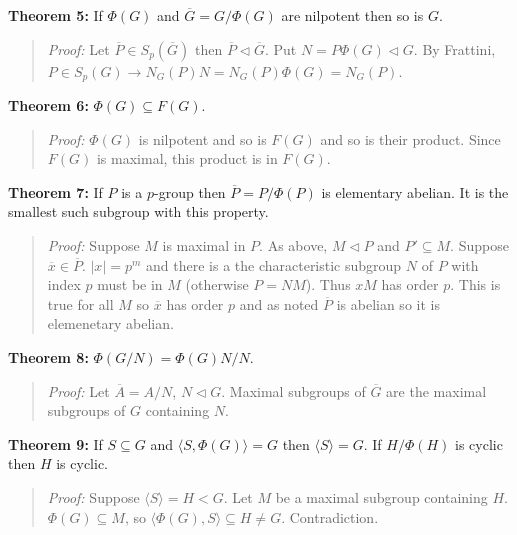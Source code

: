 {\bf Theorem 5:} If $\Phi(G)$ and ${\overline G}= G/\Phi(G)$ are nilpotent then so is $G$.
\begin{quote}
\emph{Proof:} Let ${\overline P} \in S_p({\overline G})$ then ${\overline P} \lhd {\overline G}$.
Put $N= P \Phi(G) \lhd G$.  
By Frattini, $P \in S_p(G) \rightarrow N_G(P)N= N_G(P) \Phi(G)= N_G(P)$.
\end{quote}
{\bf Theorem 6:} $\Phi(G) \subseteq F(G)$.
\begin{quote}
\emph{Proof:} $\Phi(G)$ is nilpotent and so is $F(G)$ and so is their product.  Since
$F(G)$ is maximal, this product is in $F(G)$.
\end{quote}
{\bf Theorem 7:} If $P$ is a $p$-group then ${\overline P}= P/\Phi(P)$ is elementary abelian.  It
is the smallest such subgroup with this property.
\begin{quote}
\emph{Proof:}  Suppose $M$ is maximal in $P$.  As above, $M \lhd P$ and $P' \subseteq M$.
Suppose ${\overline x} \in {\overline P}$.  $|x|= p^m$ and there is a the characteristic
subgroup $N$ of $P$ with index $p$ must be in $M$ (otherwise $P=NM$).  
Thus $xM$ has order $p$.  This is
true for all $M$ so ${\overline x}$ has order $p$ and as noted ${\overline P}$ is abelian so
it is elemenetary abelian.
\end{quote}
{\bf Theorem 8:} $\Phi(G/N)= \Phi(G)N/N$.
\begin{quote}
\emph{Proof:} Let ${\overline A}= A/N$, $N \lhd G$.  Maximal subgroups of ${\overline G}$ are
the maximal subgroups of $G$ containing $N$.
\end{quote}
{\bf Theorem 9:} If $S \subseteq G$ and $ \langle S, \Phi(G) \rangle =G$ then $ \langle S \rangle
=G$.  If $H/\Phi(H)$ is cyclic then $H$ is cyclic.
\begin{quote}
\emph{Proof:}  Suppose $ \langle S \rangle
=H < G$. Let  $M$ be a maximal subgroup containing $H$.  
$\Phi(G) \subseteq M$, so $ \langle \Phi(G), S \rangle \subseteq H \ne G$.  Contradiction.
\end{quote}
